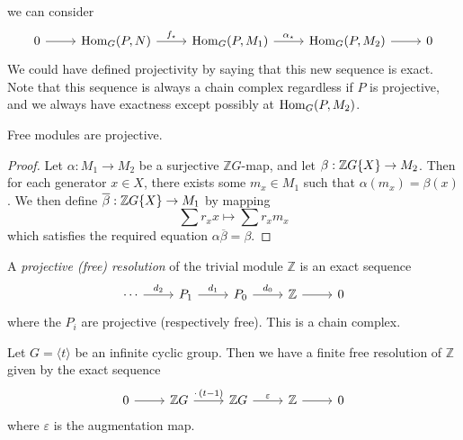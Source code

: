 we can consider
\[\begin{tikzcd}
	0 & {\Hom_G(P, N)} & {\Hom_G(P, M_1)} & {\Hom_G(P, M_2)} & 0
	\arrow[from=1-1, to=1-2]
	\arrow["{f_\star}", from=1-2, to=1-3]
	\arrow["{\alpha_\star}", from=1-3, to=1-4]
	\arrow[from=1-4, to=1-5]
\end{tikzcd}\]
We could have defined projectivity by saying that this new sequence is exact.
Note that this sequence is always a chain complex regardless if \( P \) is projective, and we always have exactness except possibly at \( \operatorname{Hom}_G(P, M_2) \).
\begin{lemma}
    Free modules are projective.
\end{lemma}
\begin{proof}
    Let \( \alpha : M_1 \to M_2 \) be a surjective \( \mathbb Z G \)-map, and let \( \beta : \mathbb Z G\qty{X} \to M_2 \).
    Then for each generator \( x \in X \), there exists some \( m_x \in M_1 \) such that \( \alpha(m_x) = \beta(x) \).
    We then define \( \overline\beta : \mathbb Z G\qty{X} \to M_1 \) by mapping
    \[ \sum r_x x \mapsto \sum r_x m_x \]
    which satisfies the required equation \( \alpha \overline\beta = \beta \).
\end{proof}
\begin{definition}
    A \emph{projective (free) resolution} of the trivial module \( \mathbb Z \) is an exact sequence
\[\begin{tikzcd}
	\cdots & {P_1} & {P_0} & {\mathbb Z} & 0
	\arrow["{d_2}", from=1-1, to=1-2]
	\arrow["{d_1}", from=1-2, to=1-3]
	\arrow["{d_0}", from=1-3, to=1-4]
	\arrow[from=1-4, to=1-5]
\end{tikzcd}\]
    where the \( P_i \) are projective (respectively free).
    This is a chain complex.
\end{definition}
\begin{example}
    Let \( G = \langle t \rangle \) be an infinite cyclic group.
    Then we have a finite free resolution of \( \mathbb Z \) given by the exact sequence
\[\begin{tikzcd}
	0 & {\mathbb Z G} & {\mathbb Z G} & {\mathbb Z} & 0
	\arrow[from=1-1, to=1-2]
	\arrow["{\cdot \,(t - 1)}", from=1-2, to=1-3]
	\arrow["\varepsilon", from=1-3, to=1-4]
	\arrow[from=1-4, to=1-5]
\end{tikzcd}\]
    where \( \varepsilon \) is the augmentation map.
\end{example}
